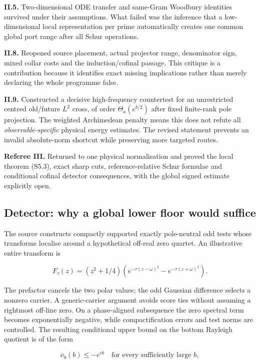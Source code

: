 \documentclass[
  10pt,
  a4paper,
  10pt,
  oneside,
  openany]{book}
\begin{document}
\textbf{II.5.} Two-dimensional ODE transfer and same-Gram Woodbury
identities survived under their assumptions. What failed was the
inference that a low-dimensional local representation per prime
automatically creates one common global port range after all Schur
operations.

\textbf{II.8.} Reopened source placement, actual projector range,
denominator sign, mixed collar costs and the induction/cofinal passage.
This critique is a contribution because it identifies exact missing
implications rather than merely declaring the whole programme false.

\textbf{II.9.} Constructed a decisive high-frequency countertest for an
unrestricted centred old/future \(L^2\) cross, of order
\(\Theta_a(e^{b/2})\) after fixed finite-rank pole projection. The
weighted Archimedean penalty means this does not refute all
\emph{observable-specific} physical energy estimates. The revised
statement prevents an invalid absolute-norm shortcut while preserving
more targeted routes.

\textbf{Referee III.} Returned to one physical normalisation and proved
the local theorem (S5.3), exact sharp cuts, reference-relative Schur
formulae and conditional cofinal detector consequences, with the global
signed estimate explicitly open.

\subsection{Detector: why a global lower floor would
suffice}\label{detector-why-a-global-lower-floor-would-suffice}

The source constructs compactly supported exactly pole-neutral odd tests
whose transforms localise around a hypothetical off-real zero quartet.
An illustrative entire transform is

\[
F_\tau(z)=(z^2+1/4)
\left(e^{-\tau(z-\omega)^2}-e^{-\tau(z+\omega)^2}\right).
\tag{S5.8}\label{eq:S5.8}
\]

The prefactor cancels the two polar values; the odd Gaussian difference
selects a nonzero carrier. A generic-carrier argument avoids score ties
without assuming a rightmost off-line zero. On a phase-aligned
subsequence the zero spectral term becomes exponentially negative, while
compactification errors and test norms are controlled. The resulting
conditional upper bound on the bottom Rayleigh quotient is of the form

\[
\nu_0(b)\le -e^{cb}
\quad\text{for every sufficiently large }b,
\tag{S5.9}\label{eq:S5.9}
\]
\end{document}
